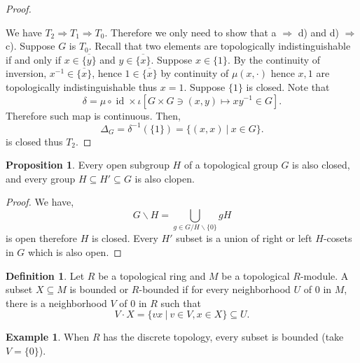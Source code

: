 \documentclass[10pt]{article}
\numberwithin{equation}{section}
\theoremstyle{definition}
\newtheorem{proposition}{Proposition}[subsection]
\newtheorem{definition}{Definition}[subsection]
\newtheorem{example}{Example}[subsection]
\DeclareMathOperator{\id}{id}
\newcommand{\sep}[0]{\:|\:}
\begin{document}
\begin{proof}$\:$
    \par We have $T_2\Rightarrow T_1\Rightarrow T_0$. Therefore we only need to show that a $\Rightarrow$ d) and d) $\Rightarrow$ c). Suppose $G$ is $T_0$. Recall that two elements are topologically indistinguishable if and only if $x\in\overline{\{y\}}$ and $y\in\overline{\{x\}}$. Suppose $x\in\{1\}$. By the continuity of inversion, $x^{-1}\in\overline{\{x\}}$, hence $1\in\overline{\{x\}}$ by continuity of $\mu(x,\cdot)$ hence $x,1$ are topologically indistinguishable thus $x=1$.
    Suppose $\{1\}$ is closed. Note that
    \begin{equation*}
      \delta =  \mu\circ\id\times \iota [G\times G\ni (x,y)\mapsto xy^{-1}\in G].
    \end{equation*}
    Therefore such map is continuous. Then,
    \begin{equation*}
        \Delta_G = \delta^{-1}(\{1\}) = \{(x,x)\sep x\in G\}.
    \end{equation*}
    is closed thus $T_2$.
\end{proof}
\begin{proposition}
    \label{fact_11_2}
    Every open subgroup $H$ of a topological group $G$ is also closed, and every group $H\subseteq H'\subseteq G$ is also clopen.
\end{proposition}
\begin{proof}
We have,
\begin{equation*}
    G\backslash H = \bigcup_{g\in G/H\backslash\{0\}}gH
\end{equation*}
is open therefore $H$ is closed. Every $H'$ subset is a union of right or left $H$-cosets in $G$ which is also open.
\end{proof}
\begin{definition}
    \label{definition_11_2}
    Let $R$ be a topological ring and $M$ be a topological $R$-module. A subset $X\subseteq M$ is bounded or $R$-bounded if for every neighborhood $U$ of $0$ in $M$, there is a neighborhood $V$ of $0$ in $R$ such that
    \begin{equation*}
        V\cdot X = \{vx \sep v\in V,x\in X\}\subseteq U.
    \end{equation*}
\end{definition}
\begin{example}
    When $R$ has the discrete topology, every subset is bounded (take $V=\{0\}$).
\end{example}
\end{document}
